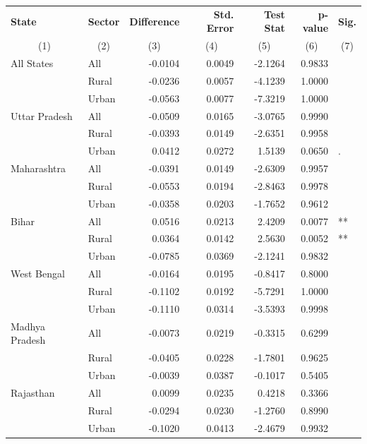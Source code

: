 
\begin{tabular}{llrrrrl}
\toprule
\textbf{State} & \textbf{Sector} & \textbf{Difference} & \textbf{Std. Error} & \textbf{Test Stat} & \textbf{p-value} & \textbf{Sig.}\\
\multicolumn{1}{c}{(1)} & \multicolumn{1}{c}{(2)} & \multicolumn{1}{c}{(3)} & \multicolumn{1}{c}{(4)} & \multicolumn{1}{c}{(5)} & \multicolumn{1}{c}{(6)} & \multicolumn{1}{c}{(7)} \\
\midrule
All States & All & -0.0104 & 0.0049 & -2.1264 & 0.9833 & \\
 & Rural & -0.0236 & 0.0057 & -4.1239 & 1.0000 & \\
 & Urban & -0.0563 & 0.0077 & -7.3219 & 1.0000 & \\
\addlinespace
Uttar Pradesh & All & -0.0509 & 0.0165 & -3.0765 & 0.9990 & \\
 & Rural & -0.0393 & 0.0149 & -2.6351 & 0.9958 & \\
 & Urban & 0.0412 & 0.0272 & 1.5139 & 0.0650 & .\\
\addlinespace
Maharashtra & All & -0.0391 & 0.0149 & -2.6309 & 0.9957 & \\
 & Rural & -0.0553 & 0.0194 & -2.8463 & 0.9978 & \\
 & Urban & -0.0358 & 0.0203 & -1.7652 & 0.9612 & \\
\addlinespace
Bihar & All & 0.0516 & 0.0213 & 2.4209 & 0.0077 & **\\
 & Rural & 0.0364 & 0.0142 & 2.5630 & 0.0052 & **\\
 & Urban & -0.0785 & 0.0369 & -2.1241 & 0.9832 & \\
\addlinespace
West Bengal & All & -0.0164 & 0.0195 & -0.8417 & 0.8000 & \\
 & Rural & -0.1102 & 0.0192 & -5.7291 & 1.0000 & \\
 & Urban & -0.1110 & 0.0314 & -3.5393 & 0.9998 & \\
\addlinespace
Madhya Pradesh & All & -0.0073 & 0.0219 & -0.3315 & 0.6299 & \\
 & Rural & -0.0405 & 0.0228 & -1.7801 & 0.9625 & \\
 & Urban & -0.0039 & 0.0387 & -0.1017 & 0.5405 & \\
\addlinespace
Rajasthan & All & 0.0099 & 0.0235 & 0.4218 & 0.3366 & \\
 & Rural & -0.0294 & 0.0230 & -1.2760 & 0.8990 & \\
 & Urban & -0.1020 & 0.0413 & -2.4679 & 0.9932 & \\
\bottomrule
\end{tabular}


